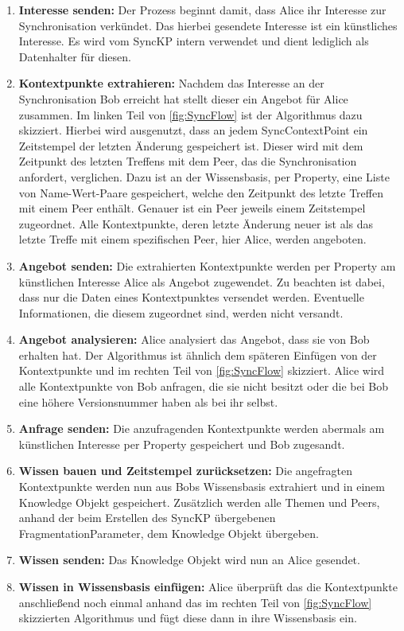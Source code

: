 \documentclass[a4paper]{article}
\begin{document}
	\begin{enumerate}
		\item \textbf{Interesse senden:} Der Prozess beginnt damit, dass Alice
		ihr Interesse zur Synchronisation verkündet. Das hierbei gesendete
		Interesse ist ein künstliches Interesse. Es wird vom SyncKP intern
		verwendet und dient lediglich als Datenhalter für diesen.
		\item \textbf{Kontextpunkte extrahieren:} Nachdem das Interesse an der
		Synchronisation Bob erreicht hat stellt dieser ein Angebot für Alice
		zusammen. Im linken Teil von \autoref{fig:SyncFlow} ist der
		Algorithmus dazu skizziert. Hierbei wird ausgenutzt, dass an jedem
		SyncContextPoint ein Zeitstempel der letzten Änderung gespeichert ist.
		Dieser wird mit dem Zeitpunkt des letzten Treffens mit dem Peer,
		das die Synchronisation anfordert, verglichen. Dazu ist an der
		Wissensbasis, per Property, eine Liste von Name-Wert-Paare gespeichert, 
		welche den Zeitpunkt des letzte Treffen mit einem Peer enthält.
		Genauer ist ein Peer jeweils einem Zeitstempel zugeordnet. Alle
		Kontextpunkte, deren letzte Änderung neuer ist als das letzte Treffe mit
		einem spezifischen Peer, hier Alice, werden angeboten.
		\item \textbf{Angebot senden:} Die extrahierten Kontextpunkte werden per
		Property am künstlichen Interesse Alice als Angebot zugewendet. Zu beachten
		ist dabei, dass nur die Daten eines Kontextpunktes versendet werden.
		Eventuelle Informationen, die diesem zugeordnet sind, werden nicht
		versandt.
		\item \textbf{Angebot analysieren:} Alice analysiert das Angebot, dass
		sie von Bob erhalten hat. Der Algorithmus ist ähnlich dem späteren Einfügen
		von der Kontextpunkte und im rechten Teil von \autoref{fig:SyncFlow}
		skizziert. Alice wird alle Kontextpunkte von Bob anfragen, die sie
		nicht besitzt oder die bei Bob eine höhere Versionsnummer haben als
		bei ihr selbst.
		\item \textbf{Anfrage senden:} Die anzufragenden Kontextpunkte werden
		abermals am künstlichen Interesse per Property gespeichert und Bob
		zugesandt.  
		\item \textbf{Wissen bauen und Zeitstempel zurücksetzen:} Die angefragten
		Kontextpunkte werden nun aus Bobs Wissensbasis extrahiert und in einem
		Knowledge Objekt gespeichert. Zusätzlich werden	alle Themen und Peers,
		anhand der beim Erstellen des SyncKP übergebenen FragmentationParameter,
		dem Knowledge Objekt übergeben.
		\item \textbf{Wissen senden:} Das Knowledge Objekt wird nun an Alice
		gesendet.
		\item \textbf{Wissen in Wissensbasis einfügen:} Alice überprüft das
		die Kontextpunkte anschließend noch einmal anhand das im rechten Teil von
		\autoref{fig:SyncFlow} skizzierten Algorithmus und fügt diese dann in
		ihre Wissensbasis ein.
	\end{enumerate} 	
	
\end{document}

